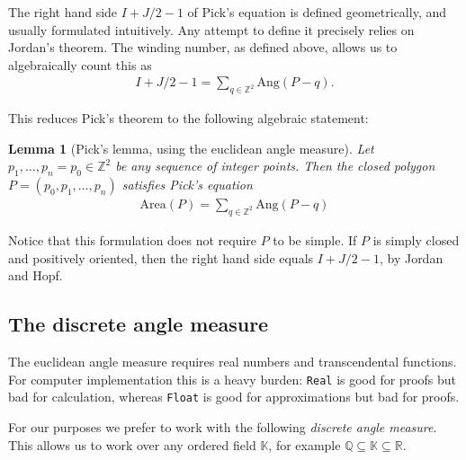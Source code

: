 \documentclass[a4paper]{amsart}
\numberwithin{equation}{section}
\theoremstyle{plain}
\newtheorem{lemma}[theorem]{Lemma}
\theoremstyle{definition}
\newcommand{\Z}{\mathbb{Z}}
\newcommand{\Q}{\mathbb{Q}}
\newcommand{\R}{\mathbb{R}}
\newcommand{\K}{\mathbb{K}}
\newcommand{\Area}{\mathrm{Area}}
\newcommand{\Ang}{\mathrm{Ang}}
\begin{document}
The right hand side $I + J/2 - 1$ of Pick's equation
is defined geometrically, and usually formulated intuitively.
Any attempt to define it precisely relies on Jordan's theorem.
The winding number, as defined above, allows us to algebraically count
this as %
\begin{align}
  I + J/2 - 1  = \sum_{q \in \Z^2} \Ang(P-q) .
\end{align}

This reduces Pick's theorem to the following algebraic statement:

\begin{lemma}[Pick's lemma, using the euclidean angle measure] \label{lem:PickEuclidean}
  Let $p_1,\ldots,p_n=p_0 \in \Z^2$ be any sequence of integer points.
  Then the closed polygon $P = (p_0,p_1,\ldots,p_n)$ satisfies Pick's equation 
  \begin{align}
    \Area(P) = \sum_{q \in \Z^2} \Ang(P-q)
  \end{align}
\end{lemma}

Notice that this formulation does not require $P$ to be simple.
If $P$ is simply closed and positively oriented, 
then the right hand side equals $I + J/2 - 1$,
by Jordan and Hopf.


\subsection{The discrete angle measure}

The euclidean angle measure requires
real numbers and transcendental functions.
For computer implementation this is a heavy burden:
\texttt{Real} is good for proofs but bad for calculation,
whereas \texttt{Float} is good for approximations but bad for proofs.

For our purposes we prefer to work with the following \emph{discrete angle measure}.
This allows us to work over any ordered field $\K$,
for example $\Q \subseteq \K \subseteq \R$.
\end{document}
